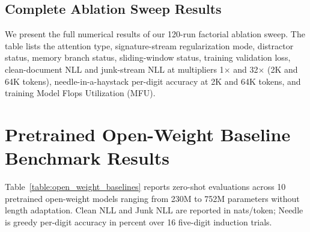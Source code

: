 \documentclass{article} %
\begin{document}
\begin{landscape}
\section{Complete Ablation Sweep Results}
\label{appendix:full_ablation}
We present the full numerical results of our 120-run factorial ablation sweep. The table lists the attention type, signature-stream regularization mode, distractor status, memory branch status, sliding-window status, training validation loss, clean-document NLL and junk-stream NLL at multipliers 1$\times$ and 32$\times$ (2K and 64K tokens), needle-in-a-haystack per-digit accuracy at 2K and 64K tokens, and training Model Flops Utilization (MFU).


\end{landscape}

\clearpage
\section{Pretrained Open-Weight Baseline Benchmark Results}
\label{appendix:open_baselines}
Table~\ref{table:open_weight_baselines} reports zero-shot evaluations across 10 pretrained open-weight models ranging from 230M to 752M parameters without length adaptation. Clean NLL and Junk NLL are reported in nats/token; Needle is greedy per-digit accuracy in percent over 16 five-digit induction trials.
\end{document}
